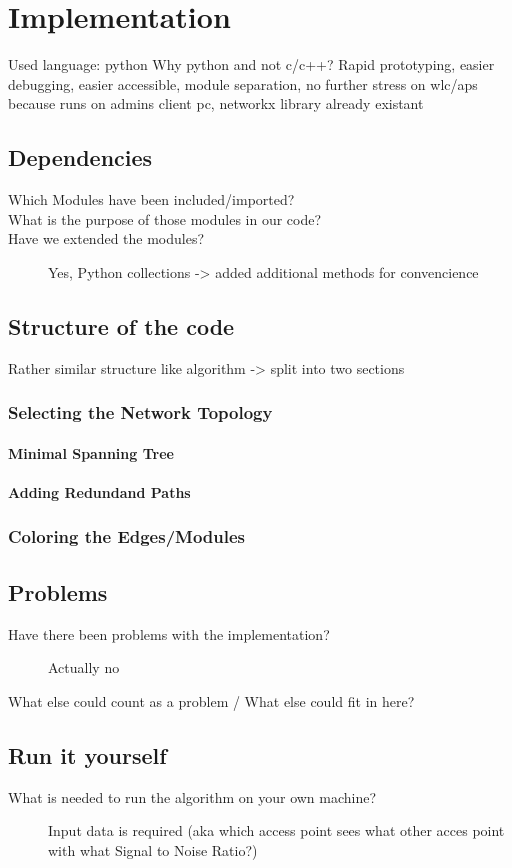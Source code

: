 \chapter{Implementation}
  Used language: python\newline
  Why python and not c/c++?
    Rapid prototyping, easier debugging, easier accessible, module separation, no further stress on wlc/aps because runs on admins client pc, networkx library already existant
\section{Dependencies}
  \begin{description}
   \item[Which Modules have been included/imported?]
   \item[What is the purpose of those modules in our code?]
   \item[Have we extended the modules?]
   Yes, Python collections -> added additional methods for convencience
  \end{description}
\section{Structure of the code}
  Rather similar structure like algorithm -> split into two sections
  \subsection{Selecting the Network Topology}
    \subsubsection{Minimal Spanning Tree}
    \subsubsection{Adding Redundand Paths}
  \subsection{Coloring the Edges/Modules}
\section{Problems}
  \begin{description}
   \item[Have there been problems with the implementation?]
   Actually no
   \item[What else could count as a problem / What else could fit in here?]
  \end{description}
\section{Run it yourself}
  \begin{description}
   \item[What is needed to run the algorithm on your own machine?]
    Input data is required (aka which access point sees what other acces point with what Signal to Noise Ratio?) \newline
  \end{description}
